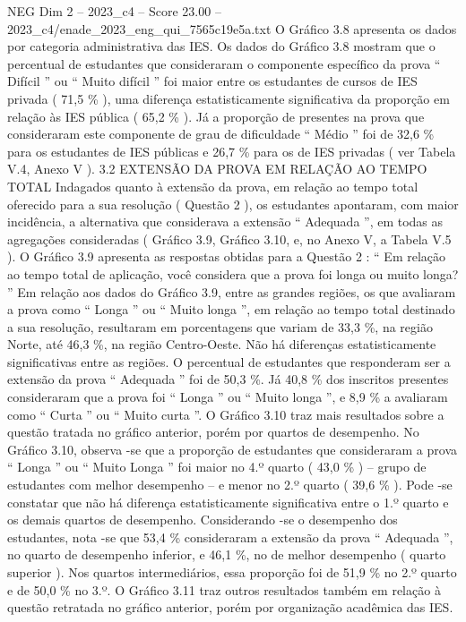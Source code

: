 \begin{textsample}{NEG Dim 2 – 2023\_c4 – Score 23.00 – 2023\_c4/enade\_2023\_eng\_qui\_7565c19e5a.txt}
O Gráfico 3.8 apresenta os dados por categoria administrativa das IES.
Os dados do Gráfico 3.8 mostram que o percentual de estudantes que consideraram o componente específico da prova “ Difícil ” ou “ Muito difícil ” foi maior entre os estudantes de cursos de IES privada ( 71,5 \% ), uma diferença estatisticamente significativa da proporção em relação às IES pública ( 65,2 \% ).
Já a proporção de presentes na prova que consideraram este componente de grau de dificuldade “ Médio ” foi de 32,6 \% para os estudantes de IES públicas e 26,7 \% para os de IES privadas ( ver Tabela V.4, Anexo V ). 3.2 EXTENSÃO DA PROVA EM RELAÇÃO AO TEMPO TOTAL Indagados quanto à extensão da prova, em relação ao tempo total oferecido para a sua resolução ( Questão 2 ), os estudantes apontaram, com maior incidência, a alternativa que considerava a extensão “ Adequada ”, em todas as agregações consideradas ( Gráfico 3.9, Gráfico 3.10, e, no Anexo V, a Tabela V.5 ).
O Gráfico 3.9 apresenta as respostas obtidas para a Questão 2 : “ Em relação ao tempo total de aplicação, você considera que a prova foi longa ou muito longa? ” Em relação aos dados do Gráfico 3.9, entre as grandes regiões, os que avaliaram a prova como “ Longa ” ou “ Muito longa ”, em relação ao tempo total destinado a sua resolução, resultaram em porcentagens que variam de 33,3 \%, na região Norte, até 46,3 \%, na região Centro-Oeste.
Não há diferenças estatisticamente significativas entre as regiões.
O percentual de estudantes que responderam ser a extensão da prova “ Adequada ” foi de 50,3 \%.
Já 40,8 \% dos inscritos presentes consideraram que a prova foi “ Longa ” ou “ Muito longa ”, e 8,9 \% a avaliaram como “ Curta ” ou “ Muito curta ”.
O Gráfico 3.10 traz mais resultados sobre a questão tratada no gráfico anterior, porém por quartos de desempenho.
No Gráfico 3.10, observa -se que a proporção de estudantes que consideraram a prova “ Longa ” ou “ Muito Longa ” foi maior no 4.º quarto ( 43,0 \% ) – grupo de estudantes com melhor desempenho – e menor no 2.º quarto ( 39,6 \% ).
Pode -se constatar que não há diferença estatisticamente significativa entre o 1.º quarto e os demais quartos de desempenho.
Considerando -se o desempenho dos estudantes, nota -se que 53,4 \% consideraram a extensão da prova “ Adequada ”, no quarto de desempenho inferior, e 46,1 \%, no de melhor desempenho ( quarto superior ).
Nos quartos intermediários, essa proporção foi de 51,9 \% no 2.º quarto e de 50,0 \% no 3.º.
O Gráfico 3.11 traz outros resultados também em relação à questão retratada no gráfico anterior, porém por organização acadêmica das IES.

\end{textsample}
